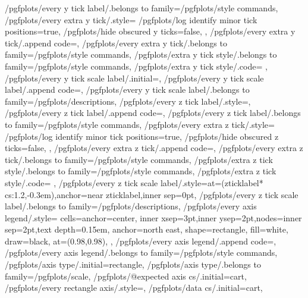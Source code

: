 {	/pgfplots/every y tick label/.belongs to family=/pgfplots/style commands,
	/pgfplots/every extra y tick/.style={
		/pgfplots/log identify minor tick positions=true,
		/pgfplots/hide obscured y ticks=false,
	},
	/pgfplots/every extra y tick/.append code={},
	/pgfplots/every extra y tick/.belongs to family=/pgfplots/style commands,
	/pgfplots/extra y tick style/.belongs to family=/pgfplots/style commands,
	/pgfplots/extra y tick style/.code={%
	},
	/pgfplots/every y tick scale label/.initial=,%
	/pgfplots/every y tick scale label/.append code={},
	/pgfplots/every y tick scale label/.belongs to family=/pgfplots/descriptions,
	/pgfplots/every z tick label/.style={},
	/pgfplots/every z tick label/.append code={},
	/pgfplots/every z tick label/.belongs to family=/pgfplots/style commands,
	/pgfplots/every extra z tick/.style={
		/pgfplots/log identify minor tick positions=true,
		/pgfplots/hide obscured z ticks=false,
	},
	/pgfplots/every extra z tick/.append code={},
	/pgfplots/every extra z tick/.belongs to family=/pgfplots/style commands,
	/pgfplots/extra z tick style/.belongs to family=/pgfplots/style commands,
	/pgfplots/extra z tick style/.code={%
	},
	/pgfplots/every z tick scale label/.style={at={(zticklabel* cs:1.2,-0.3em)},anchor=near zticklabel,inner sep=0pt},
	/pgfplots/every z tick scale label/.belongs to family=/pgfplots/descriptions,
	/pgfplots/every axis legend/.style={%
		cells={anchor=center},
		inner xsep=3pt,inner ysep=2pt,nodes={inner sep=2pt,text depth=0.15em},
		anchor=north east,%
		shape=rectangle,%
		fill=white,%
		draw=black,
		at={(0.98,0.98)},
	},
	/pgfplots/every axis legend/.append code={},
	/pgfplots/every axis legend/.belongs to family=/pgfplots/style commands,
	/pgfplots/axis type/.initial=rectangle,
	/pgfplots/axis type/.belongs to family=/pgfplots/scale,
	/pgfplots/@expected axis cs/.initial=cart,
	/pgfplots/every rectangle axis/.style={},
	/pgfplots/data cs/.initial=cart,%
}
